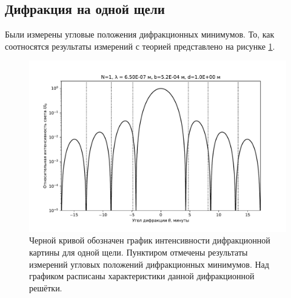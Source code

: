 \documentclass[12pt]{article}
\begin{document}
	\subsection{Дифракция на одной щели}
	Были измерены угловые положения дифракционных минимумов. То, как соотносятся результаты измерений с теорией представлено на рисунке \ref{fig:figure2}.
	\begin{figure}[ht]
		\centering
		\includegraphics[width=\linewidth]{../plots/dif_1}
		\caption{Черной кривой обозначен график интенсивности дифракционной картины для одной щели. Пунктиром отмечены результаты измерений угловых положений дифракционных минимумов. Над графиком расписаны характеристики данной дифракционной решётки.}
		\label{fig:figure2}
	\end{figure}
\end{document}
